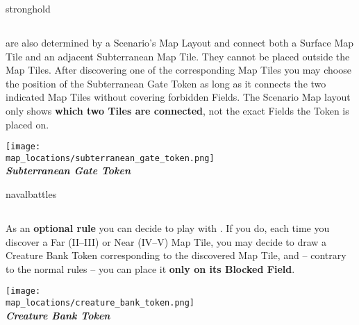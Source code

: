 \begin{multicols}{2}
\begin{expansion}[before=\vspace*{-11mm}]{stronghold}
  \subsection*{}
   are also determined by a Scenario's Map Layout and connect both a Surface Map Tile and an adjacent Subterranean Map Tile.
  They cannot be placed outside the Map Tiles.
  After discovering one of the corresponding Map Tiles you may choose the position of the Subterranean Gate Token as long as it connects the two indicated Map Tiles without covering forbidden Fields.
  The Scenario Map layout only shows \textbf{which two Tiles are connected}, not the exact Fields the Token is placed on.
  \bigskip
  \begin{center}
    \texttt{[image: \\map\_locations/subterranean\_gate\_token.png]}\\
    \footnotesize{\textbf{\textit{\textcolor{darkcandyapplered}{Subterranean Gate Token}}}}
  \end{center}
\end{expansion}

\bigskip

\begin{expansion}[before=\vspace*{0pt}]{navalbattles}
  \subsection*{}
  As an \textbf{optional rule} you can decide to play with .
  If you do, each time you discover a Far \mbox{(II--III)} or Near \mbox{(IV--V)} Map Tile, you may decide to draw a Creature Bank Token corresponding to the discovered Map Tile, and -- contrary to the normal rules -- you can place it \textbf{only on its Blocked Field}.
  \bigskip
  \begin{center}
    \texttt{[image: \\map\_locations/creature\_bank\_token.png]}\\
    \footnotesize{\textbf{\textit{\textcolor{darkcandyapplered}{Creature Bank Token}}}}
  \end{center}
\end{expansion}
\end{multicols}
